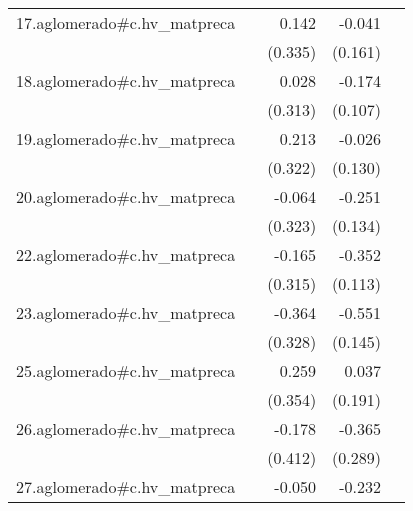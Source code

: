 {\begin{longtable}{l*{4}{D{.}{.}{-1}}}
\addlinespace
17.aglomerado#c.hv\_matpreca&                     &       0.142         &      -0.041         &                     \\
            &                     &     (0.335)         &     (0.161)         &                     \\
\addlinespace
18.aglomerado#c.hv\_matpreca&                     &       0.028         &      -0.174         &                     \\
            &                     &     (0.313)         &     (0.107)         &                     \\
\addlinespace
19.aglomerado#c.hv\_matpreca&                     &       0.213         &      -0.026         &                     \\
            &                     &     (0.322)         &     (0.130)         &                     \\
\addlinespace
20.aglomerado#c.hv\_matpreca&                     &      -0.064         &      -0.251         &                     \\
            &                     &     (0.323)         &     (0.134)         &                     \\
\addlinespace
22.aglomerado#c.hv\_matpreca&                     &      -0.165         &      -0.352\sym{**} &                     \\
            &                     &     (0.315)         &     (0.113)         &                     \\
\addlinespace
23.aglomerado#c.hv\_matpreca&                     &      -0.364         &      -0.551\sym{***}&                     \\
            &                     &     (0.328)         &     (0.145)         &                     \\
\addlinespace
25.aglomerado#c.hv\_matpreca&                     &       0.259         &       0.037         &                     \\
            &                     &     (0.354)         &     (0.191)         &                     \\
\addlinespace
26.aglomerado#c.hv\_matpreca&                     &      -0.178         &      -0.365         &                     \\
            &                     &     (0.412)         &     (0.289)         &                     \\
\addlinespace
27.aglomerado#c.hv\_matpreca&                     &      -0.050         &      -0.232\sym{***}&                     \\

\end{longtable}}
